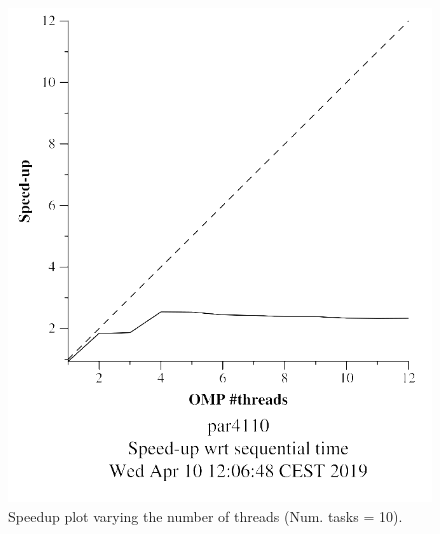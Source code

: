 \documentclass[12pt, a4paper]{article}
\begin{document}
\begin{figure}[H]
\begin{minipage}[b]{0.4\linewidth}
  \includegraphics[scale=0.5]{./mandel-omp-10000-strong-omp-3-10-speedup}
  \caption{Speedup plot varying the number of threads (Num. tasks = 10).}
  \label{fig:mandel-omp-10000-strong-omp-3-10-speedup}
\end{minipage}
\end{figure}
\end{document}
